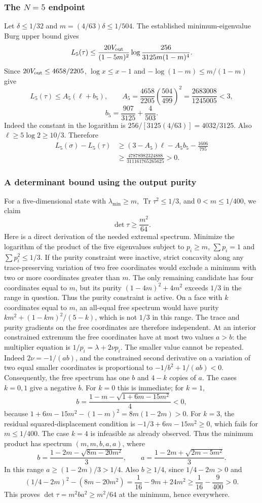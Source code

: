 \documentclass[11pt,a4paper]{article}
\newcommand{\Tr}{\operatorname{Tr}}
\begin{document}
\subsubsection{The $N=5$ endpoint}
Let $\delta\le1/32$ and $m=(4/63)\delta\le1/504$.
The established minimum-eigenvalue Burg upper bound gives
\[
L_5(\tau)\le\frac{20V_{\rm out}}{(1-5m)^2}
 \log\frac{256}{3125m(1-m)^4}.
\]
Since $20V_{\rm out}\le4658/2205$, $\log x\le x-1$ and
$-\log(1-m)\le m/(1-m)$ give
\[
L_5(\tau)\le A_5(\ell+b_5),\qquad
A_5=\frac{4658}{2205}\left(\frac{504}{499}\right)^2
=\frac{2683008}{1245005}<3,
\]
\[
b_5=\frac{907}{3125}+\frac4{503}.
\]
Indeed the constant in the logarithm is
$256/[3125(4/63)]=4032/3125$.
Also $\ell\ge5\log2\ge10/3$. Therefore
\begin{align*}
L_5(\sigma)-L_5(\tau)
&\ge(3-A_5)\ell-A_5b_5-\frac{1606}{795}\\
&\ge\frac{47878982324888}{311161765265625}>0.
\end{align*}

\subsubsection{A determinant bound using the output purity}
For a five-dimensional state with $\lambda_{\min}\ge m$,
$\Tr\tau^2\le1/3$, and $0<m\le1/400$, we claim
\[
\det\tau\ge\frac{m^2}{64}.
\]
Here is a direct derivation of the needed extremal spectrum.
Minimize the logarithm of the product of the five eigenvalues subject to
$p_i\ge m$, $\sum p_i=1$ and $\sum p_i^2\le1/3$.
If the purity constraint were inactive, strict concavity along any
trace-preserving variation of two free coordinates would exclude a
minimum with two or more coordinates greater than $m$.
The only remaining candidate has four coordinates equal to $m$, but its
purity $(1-4m)^2+4m^2$ exceeds $1/3$ in the range in question.
Thus the purity constraint is active.
On a face with $k$ coordinates equal to $m$, an all-equal free spectrum
would have purity $km^2+(1-km)^2/(5-k)$, which is not $1/3$ in this
range. The trace and purity gradients on the free coordinates are therefore
independent. At an interior constrained extremum the free coordinates
have at most two values $a>b$:
the multiplier equation is $1/p_i=\lambda+2\nu p_i$.
The smaller value cannot be repeated. Indeed $2\nu=-1/(ab)$, and the
constrained second derivative on a variation of two equal smaller
coordinates is proportional to $-1/b^2+1/(ab)<0$.
Consequently, the free spectrum has one $b$ and $4-k$ copies of $a$.
The cases $k=0,1$ give a negative $b$. For $k=0$ this is immediate;
for $k=1$,
\[
b=\frac{1-m-\sqrt{1+6m-15m^2}}4<0,
\]
because $1+6m-15m^2-(1-m)^2=8m(1-2m)>0$.
For $k=3$, the residual squared-displacement condition is
$-1/3+6m-15m^2\ge0$, which fails for $m\le1/400$.
The case $k=4$ is infeasible as already observed.
Thus the minimum product has spectrum $(m,m,b,a,a)$, where
\[
b=\frac{1-2m-\sqrt{8m-20m^2}}3,\qquad
 a=\frac{1-2m+\sqrt{2m-5m^2}}3.
\]
In this range $a\ge(1-2m)/3>1/4$.
Also $b\ge1/4$, since $1/4-2m>0$ and
\[
(1/4-2m)^2-(8m-20m^2)
=\frac1{16}-9m+24m^2\ge\frac1{16}-\frac9{400}>0.
\]
This proves $\det\tau=m^2ba^2\ge m^2/64$ at the minimum, hence everywhere.
\end{document}
